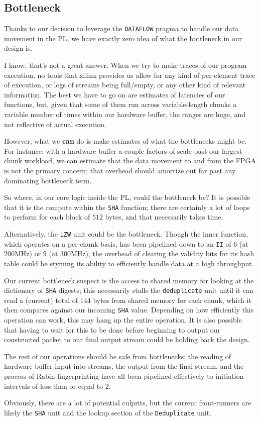 \documentclass{article}
\begin{document}
\subsection{Bottleneck}

Thanks to our decision to leverage the \texttt{DATAFLOW} pragma to handle our data movement in the PL, we have exactly zero idea of what the bottleneck in our design is.
\par
I know, that's not a great answer. When we try to make traces of our program execution, no tools that xilinx provides us allow for any kind of per-element trace of execution, or logs of streams being full/empty, or any other kind of relevant information. The best we have to go on are estimates of latencies of our functions, but, given that some of them run across variable-length chunks a variable number of times within our hardware buffer, the ranges are huge, and not reflective of actual execution.
\newline\par
However, what we \textbf{can} do is make estimates of what the bottlenecks might be. For instance: with a hardware buffer a couple factors of scale past our largest chunk workload, we can estimate that the data movement to and from the FPGA is not the primary concern; that overhead should amortize out far past any dominating bottleneck term.
\newline\par
So where, in our core logic inside the PL, could the bottleneck be? It is possible that it is the compute within the \texttt{SHA} function; there are certainly a lot of loops to perform for each block of $512$ bytes, and that necessarily takes time.
\par
Alternatively, the \texttt{LZW} unit could be the bottleneck. Though the inner function, which operates on a per-chunk basis, has been pipelined down to an \texttt{II} of $6$ (at 200MHz) or $9$ (at 300MHz), the overhead of clearing the validity bits for its hash table could be styming its ability to efficiently handle data at a high throughput.
\par
Our current bottleneck suspect is the access to shared memory for looking at the dictionary of \texttt{SHA} digests; this necessarily stalls the \texttt{deduplicate} unit until it can read a (current) total of $144$ bytes from shared memory for each chunk, which it then compares against our incoming \texttt{SHA} value. Depending on how efficiently this operation can work, this may hang up the entire operation. It is also possible that having to wait for this to be done before beginning to output our constructed packet to our final output stream could be holding back the design.
\par
The rest of our operations should be safe from bottlenecks; the reading of hardware buffer input into streams, the output from the final stream, and the process of Rabin-fingerprinting have all been pipelined effectively to initiation intervals of less than or equal to $2$.
\newline\par
Obviously, there are a lot of potential culprits, but the current front-runners are likely the \texttt{SHA} unit and the lookup section of the \texttt{Deduplicate} unit.
\end{document}
